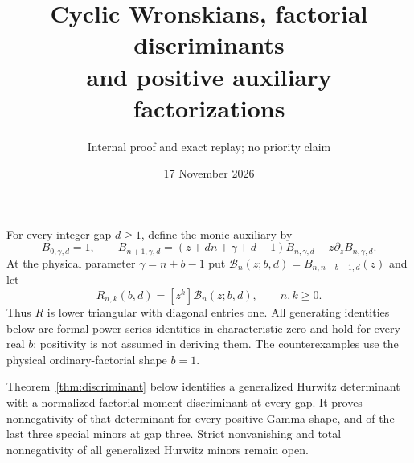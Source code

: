 \documentclass[11pt]{article}
\title{Cyclic Wronskians, factorial discriminants\\and positive auxiliary factorizations}
\author{Internal proof and exact replay; no priority claim}
\date{17 November 2026}
\begin{document}
\maketitle
For every integer gap $d\ge1$, define the monic auxiliary by
\[
 B_{0,\gamma,d}=1,\qquad
 B_{n+1,\gamma,d}=(z+dn+\gamma+d-1)B_{n,\gamma,d}
                                      -z\partial_zB_{n,\gamma,d}.
                                                               \tag{1}
\]
At the physical parameter $\gamma=n+b-1$ put
$\mathcal B_n(z;b,d)=B_{n,n+b-1,d}(z)$ and let
\[
 R_{n,k}(b,d)=[z^k]\mathcal B_n(z;b,d),\qquad n,k\ge0.
\]
Thus $R$ is lower triangular with diagonal entries one.
All generating identities below are formal power-series identities
in characteristic zero and hold for every real $b$; positivity is not
assumed in deriving them. The counterexamples use the physical
ordinary-factorial shape $b=1$.

Theorem~\ref{thm:discriminant} below identifies a generalized Hurwitz
determinant with a normalized factorial-moment discriminant at every gap.
It proves nonnegativity of that determinant for every positive Gamma shape,
and of the last three special minors at gap three. Strict nonvanishing
and total nonnegativity of all generalized Hurwitz minors remain open.
\end{document}

